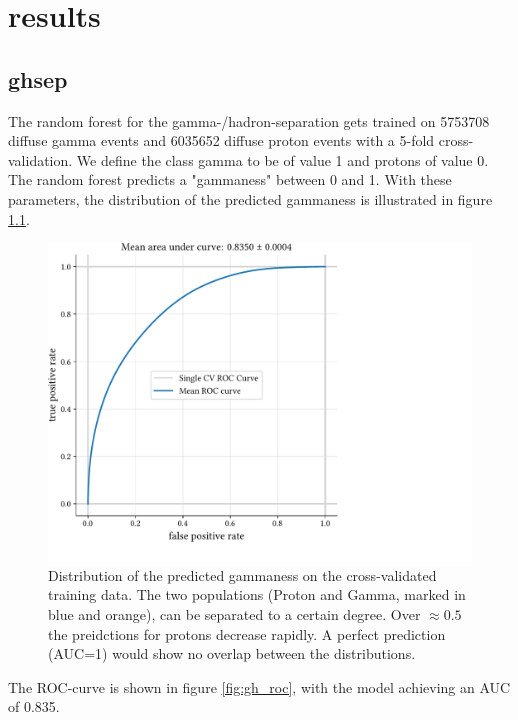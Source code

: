 \chapter{results}\label{results}


\section{ghsep}\label{ghsep}

The random forest for the gamma-/hadron-separation gets trained on 
\num{5753708} diffuse gamma events and \num{6035652} diffuse proton events with a 5-fold cross-validation.
We define the class gamma to be of value 1 and protons of value 0.
The random forest predicts a "gammaness" between 0 and 1.
With these parameters, the distribution of the predicted gammaness
is illustrated in figure \ref{fig:gh_sep}.

\begin{figure}
    \centering
    \includegraphics[page=2, width=.8\textwidth]{../analysis/plots/cross_val_sep_perf_plot.pdf}
    \caption{Distribution of the predicted gammaness on the cross-validated training data.
	    The two populations (Proton and Gamma, marked in blue and orange), can be separated 
	    to a certain degree. Over $\approx \num{0.5}$ the preidctions for protons decrease rapidly.
        A perfect prediction (AUC=1) would show no overlap between the distributions.}
    \label{fig:gh_sep}
\end{figure}

The ROC-curve is shown in figure \ref{fig:gh_roc}, with the model achieving an AUC of 
\num{0.835}.


